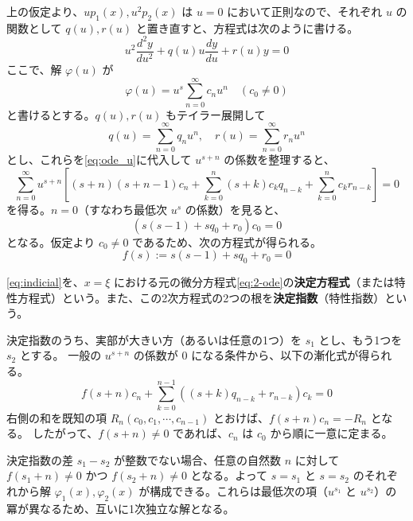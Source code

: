 上の仮定より、$u p_{1}(x), u^{2} p_{2}(x)$ は $u=0$ において正則なので、それぞれ $u$ の関数として $q(u), r(u)$ と置き直すと、方程式は次のように書ける。
\begin{equation}\label{eq:ode_u}
u^{2}\frac{d^{2}y}{du^{2}} + q(u) u\frac{dy}{du} + r(u) y = 0
\end{equation}
ここで、解 $\varphi(u)$ が
\[
\varphi(u) = u^{s}\sum_{n=0}^{\infty}c_{n}u^{n} \quad (c_{0}\neq 0)
\]
と書けるとする。$q(u), r(u)$ もテイラー展開して
\[
q(u) = \sum_{n=0}^{\infty}q_{n}u^{n}, \quad r(u) = \sum_{n=0}^{\infty}r_{n}u^{n}
\]
とし、これらを\eqref{eq:ode_u}に代入して $u^{s+n}$ の係数を整理すると、
\[
\sum_{n=0}^{\infty} u^{s+n} \left[ (s+n)(s+n-1)c_{n} + \sum_{k=0}^{n} (s+k)c_{k}q_{n-k} + \sum_{k=0}^{n} c_{k}r_{n-k} \right] = 0
\]
を得る。$n=0$（すなわち最低次 $u^s$ の係数）を見ると、
\[
(s(s-1) + sq_{0} + r_{0})c_{0} = 0
\]
となる。仮定より $c_{0} \neq 0$ であるため、次の方程式が得られる。
\begin{equation}\label{eq:indicial}
f(s) := s(s-1) + sq_{0} + r_{0} = 0
\end{equation}

\begin{definition}
\eqref{eq:indicial}を、$x=\xi$ における元の微分方程式\eqref{eq:2-ode}の\textbf{決定方程式}（または特性方程式）という。また、この2次方程式の2つの根を\textbf{決定指数}（特性指数）という。
\end{definition}

決定指数のうち、実部が大きい方（あるいは任意の1つ）を $s_{1}$ とし、もう1つを $s_{2}$ とする。
一般の $u^{s+n}$ の係数が $0$ になる条件から、以下の漸化式が得られる。
\begin{equation}\label{eq:recurrence}
f(s+n)c_{n} + \sum_{k=0}^{n-1} \left( (s+k)q_{n-k} + r_{n-k} \right) c_{k} = 0
\end{equation}
右側の和を既知の項 $R_n(c_{0}, c_{1}, \cdots, c_{n-1})$ とおけば、$f(s+n)c_{n} = -R_n$ となる。
したがって、$f(s+n) \neq 0$ であれば、$c_{n}$ は $c_{0}$ から順に一意に定まる。

決定指数の差 $s_{1} - s_{2}$ が整数でない場合、任意の自然数 $n$ に対して $f(s_{1}+n) \neq 0$ かつ $f(s_{2}+n) \neq 0$ となる。よって $s=s_{1}$ と $s=s_{2}$ のそれぞれから解 $\varphi_{1}(x), \varphi_{2}(x)$ が構成できる。これらは最低次の項（$u^{s_1}$ と $u^{s_2}$）の冪が異なるため、互いに1次独立な解となる。

